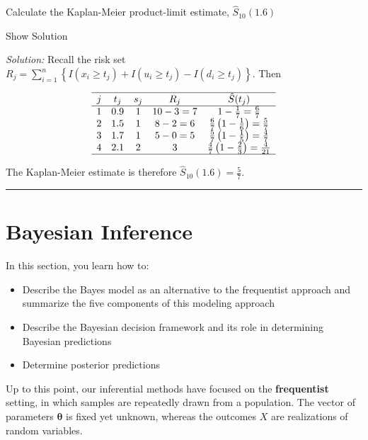 \documentclass[]{book}
\providecommand{\tightlist}{%
  \setlength{\itemsep}{0pt}\setlength{\parskip}{0pt}}
\theoremstyle{definition}
\theoremstyle{definition}
\theoremstyle{definition}
\theoremstyle{remark}
\begin{document}
Calculate the Kaplan-Meier product-limit estimate, \(\hat{S}_{10}(1.6)\)

Show Solution

\hypertarget{toggleExamC135}{}
\emph{Solution:} Recall the risk set
\(R_j = \sum_{i=1}^n \left\{ I(x_i \geq t_{j}) + I(u_i \geq t_{j}) - I(d_i \geq t_{j}) \right\}\).
Then

\[\begin{array}{ccccc}
\hline
j & t_j & s_j & R_j & \hat{S}(t_j) \\
\hline 
1  & 0.9   & 1   & 10-3 = 7 & 1-\frac{1}{7} = \frac{6}{7} \\
2  & 1.5   & 1   & 8-2 = 6  & \frac{6}{7}\left( 1 - \frac{1}{6} \right) = \frac{5}{7}\\
3  & 1.7   & 1   & 5-0 = 5  & \frac{5}{7}\left( 1 - \frac{1}{5} \right) = \frac{4}{7}\\
4  & 2.1   & 2   & 3        & \frac{4}{7}\left( 1 - \frac{2}{3}\right) = \frac{4}{21}\\
\hline
\end{array}\]

The Kaplan-Meier estimate is therefore
\(\hat{S}_{10}(1.6) = \frac{5}{7}\).

\begin{center}\rule{0.5\linewidth}{\linethickness}\end{center}

\section{Bayesian Inference}\label{S:BayesInference}

In this section, you learn how to:

\begin{itemize}
\tightlist
\item
  Describe the Bayes model as an alternative to the frequentist approach
  and summarize the five components of this modeling approach
\item
  Describe the Bayesian decision framework and its role in determining
  Bayesian predictions
\item
  Determine posterior predictions
\end{itemize}

Up to this point, our inferential methods have focused on the
\textbf{frequentist} setting, in which samples are repeatedly drawn from
a population. The vector of parameters \(\boldsymbol \theta\) is fixed
yet unknown, whereas the outcomes \(X\) are realizations of random
variables.
\end{document}
